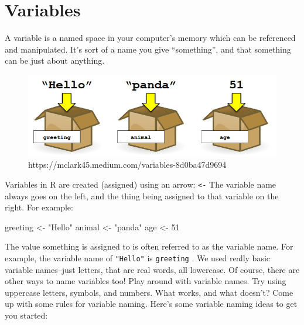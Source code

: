 \documentclass[
  letterpaper,
  DIV=11,
  numbers=noendperiod]{scrreprt}
\newenvironment{Shaded}{\begin{snugshade}}{\end{snugshade}}
\newcommand{\DecValTok}[1]{\textcolor[rgb]{0.68,0.00,0.00}{#1}}
\newcommand{\NormalTok}[1]{\textcolor[rgb]{0.00,0.23,0.31}{#1}}
\newcommand{\OtherTok}[1]{\textcolor[rgb]{0.00,0.23,0.31}{#1}}
\newcommand{\StringTok}[1]{\textcolor[rgb]{0.13,0.47,0.30}{#1}}
\begin{document}
\section{Variables}\label{variables}

A variable is a named space in your computer's memory which can be
referenced and manipulated. It's sort of a name you give ``something'',
and that something can be just about anything.

\begin{figure}[H]

{\centering \includegraphics{scripts/01_codingBasics/class1-files/variables.png}

}

\caption{https://mclark45.medium.com/variables-8d0ba47d9694}

\end{figure}%

Variables in R are created (assigned) using an arrow:
\texttt{\textless{}-} The variable name always goes on the left, and the
thing being assigned to that variable on the right. For example:

\begin{Shaded}
\begin{Highlighting}[]
\NormalTok{greeting }\OtherTok{\textless{}{-}} \StringTok{"Hello"}
\NormalTok{animal }\OtherTok{\textless{}{-}} \StringTok{"panda"}
\NormalTok{age }\OtherTok{\textless{}{-}} \DecValTok{51}
\end{Highlighting}
\end{Shaded}

The value something is assigned to is often referred to as the variable
name. For example, the variable name of \texttt{"Hello"} is
\texttt{greeting} . We used really basic variable names--just letters,
that are real words, all lowercase. Of course, there are other ways to
name variables too! Play around with variable names. Try using uppercase
letters, symbols, and numbers. What works, and what doesn't? Come up
with some rules for variable naming. Here's some variable naming ideas
to get you started:
\end{document}
